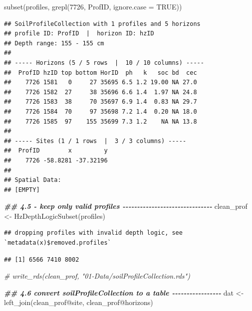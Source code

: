 \documentclass[
  10pt,
  b5paper,
  oneside]{book}
\newenvironment{Shaded}{\begin{snugshade}}{\end{snugshade}}
\newcommand{\AttributeTok}[1]{\textcolor[rgb]{0.77,0.63,0.00}{#1}}
\newcommand{\CommentTok}[1]{\textcolor[rgb]{0.56,0.35,0.01}{\textit{#1}}}
\newcommand{\ConstantTok}[1]{\textcolor[rgb]{0.00,0.00,0.00}{#1}}
\newcommand{\DecValTok}[1]{\textcolor[rgb]{0.00,0.00,0.81}{#1}}
\newcommand{\DocumentationTok}[1]{\textcolor[rgb]{0.56,0.35,0.01}{\textbf{\textit{#1}}}}
\newcommand{\FunctionTok}[1]{\textcolor[rgb]{0.00,0.00,0.00}{#1}}
\newcommand{\NormalTok}[1]{#1}
\newcommand{\OtherTok}[1]{\textcolor[rgb]{0.56,0.35,0.01}{#1}}
\newcommand{\SpecialCharTok}[1]{\textcolor[rgb]{0.00,0.00,0.00}{#1}}
\begin{document}
\begin{Shaded}
\begin{Highlighting}[]
\FunctionTok{subset}\NormalTok{(profiles, }\FunctionTok{grepl}\NormalTok{(}\DecValTok{7726}\NormalTok{, ProfID, }\AttributeTok{ignore.case =} \ConstantTok{TRUE}\NormalTok{))}
\end{Highlighting}
\end{Shaded}

\begin{verbatim}
## SoilProfileCollection with 1 profiles and 5 horizons
## profile ID: ProfID  |  horizon ID: hzID 
## Depth range: 155 - 155 cm
## 
## ----- Horizons (5 / 5 rows  |  10 / 10 columns) -----
##  ProfID hzID top bottom HorID  ph   k   soc bd  cec
##    7726 1581   0     27 35695 6.5 1.2 19.00 NA 27.0
##    7726 1582  27     38 35696 6.6 1.4  1.97 NA 24.8
##    7726 1583  38     70 35697 6.9 1.4  0.83 NA 29.7
##    7726 1584  70     97 35698 7.2 1.4  0.20 NA 18.0
##    7726 1585  97    155 35699 7.3 1.2    NA NA 13.8
## 
## ----- Sites (1 / 1 rows  |  3 / 3 columns) -----
##  ProfID        x         y
##    7726 -58.8281 -37.32196
## 
## Spatial Data:
## [EMPTY]
\end{verbatim}

\begin{Shaded}
\begin{Highlighting}[]
\DocumentationTok{\#\# 4.5 {-} keep only valid profiles {-}{-}{-}{-}{-}{-}{-}{-}{-}{-}{-}{-}{-}{-}{-}{-}{-}{-}{-}{-}{-}{-}{-}{-}{-}{-}{-}{-}{-}{-}{-}}
\NormalTok{clean\_prof }\OtherTok{\textless{}{-}} \FunctionTok{HzDepthLogicSubset}\NormalTok{(profiles)}
\end{Highlighting}
\end{Shaded}

\begin{verbatim}
## dropping profiles with invalid depth logic, see `metadata(x)$removed.profiles`
\end{verbatim}

\begin{Shaded}
\end{Shaded}

\begin{verbatim}
## [1] 6566 7410 8002
\end{verbatim}

\begin{Shaded}
\begin{Highlighting}[]
\CommentTok{\# write\_rds(clean\_prof, "01{-}Data/soilProfileCollection.rds")}

\DocumentationTok{\#\# 4.6 convert soilProfileCollection to a table {-}{-}{-}{-}{-}{-}{-}{-}{-}{-}{-}{-}{-}{-}{-}{-}{-}}
\NormalTok{dat }\OtherTok{\textless{}{-}} \FunctionTok{left\_join}\NormalTok{(clean\_prof}\SpecialCharTok{@}\NormalTok{site, clean\_prof}\SpecialCharTok{@}\NormalTok{horizons)}
\end{Highlighting}
\end{Shaded}
\end{document}
